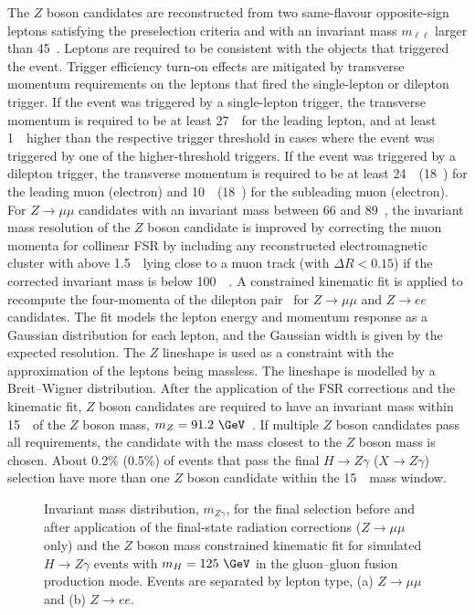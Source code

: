 The $Z$ boson candidates are reconstructed from two same-flavour opposite-sign leptons satisfying 
the preselection criteria and with an invariant mass $m_{\ell\ell}$ larger than 45~\GeV. 
Leptons are required to be consistent with the objects that triggered the 
event. Trigger efficiency turn-on effects are mitigated by transverse momentum requirements on the leptons
that fired the single-lepton or dilepton trigger. If the event was triggered by a single-lepton trigger, the
transverse momentum is required to be at least 27~\GeV\ for the leading lepton, and at
least 1~\GeV\ higher than the respective trigger threshold in cases where the event was
triggered by one of the higher-threshold triggers. If the event was triggered by a
dilepton trigger, the transverse momentum is required to be 
at least 24~\GeV\ (18~\GeV) for the 
leading muon (electron) and 10~\GeV\ (18~\GeV) for the subleading muon (electron).
For $Z\to\mu\mu$ candidates with an invariant mass between 66 and 89~\GeV, 
the invariant mass resolution of the $Z$ boson candidate
is improved by correcting the muon momenta for collinear FSR by including 
any reconstructed electromagnetic cluster with \pt above 1.5~\GeV\ lying close
to a muon track (with $\Delta R < 0.15$) if the corrected invariant mass is below 
100~\GeV~\cite{Aad:2014aba}.
A constrained kinematic fit is applied to recompute the 
four-momenta of the dilepton pair~\cite{Aad:2014eva} for $Z\to\mu\mu$ and $Z\to ee$ candidates. 
The fit models the lepton energy and momentum
response as a Gaussian distribution for each lepton, and the Gaussian width is given by the expected resolution.
The $Z$ lineshape is used as a constraint with the approximation of the leptons being massless. The
lineshape is modelled by a Breit--Wigner distribution.
After the application of the FSR corrections and the kinematic fit, $Z$ boson candidates are required to have 
an invariant mass within 15~\GeV\
of the $Z$ boson mass, $m_Z = 91.2~\GeV$~\cite{Olive:2016xmw}. If multiple $Z$ boson candidates pass all
requirements, the candidate with the mass closest to the $Z$ boson mass is chosen.
About 0.2\% (0.5\%) of events that pass the final $H\to Z\gamma$ ($X\to Z\gamma$) selection 
have more than one $Z$ boson candidate within the
15~\GeV\ mass window. 

\begin{figure}[b]
%
\caption{Invariant mass distribution, $m_{Z\gamma}$, for the final selection 
before and after application of the final-state radiation corrections ($Z\to\mu\mu$ only) 
and the $Z$ boson mass 
constrained kinematic 
fit for simulated $H\to Z\gamma$ events with $m_H = 125~\GeV$ in the gluon--gluon fusion production mode. 
Events are separated by lepton type, (a) $Z\to\mu\mu$ and (b) $Z\to ee$.}
\label{fig:mllgamma}
\end{figure}


